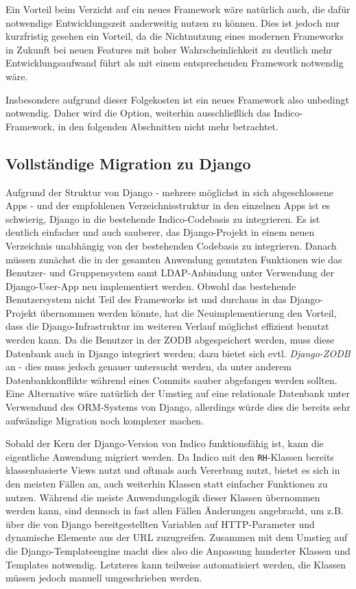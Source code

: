 Ein Vorteil beim Verzicht auf ein neues Framework wäre natürlich auch, die dafür notwendige
Entwicklungszeit anderweitig nutzen zu können. Dies ist jedoch nur kurzfristig gesehen ein Vorteil,
da die Nichtnutzung eines modernen Frameworks in Zukunft bei neuen Features mit hoher
Wahrscheinlichkeit zu deutlich mehr Entwicklungsaufwand führt als mit einem entsprechenden Framework
notwendig wäre.

Insbesondere aufgrund dieser Folgekosten ist ein neues Framework also unbedingt notwendig. Daher
wird die Option, weiterhin ausschließlich das Indico-Framework, in den folgenden Abschnitten nicht
mehr betrachtet.


\subsection{Vollständige Migration zu Django}
Aufgrund der Struktur von Django - mehrere möglichst in sich abgeschlossene Apps - und der
empfohlenen Verzeichnisstruktur in den einzelnen Apps ist es schwierig, Django in die bestehende
Indico-Codebasis zu integrieren. Es ist deutlich einfacher und auch sauberer, das Django-Projekt in
einem neuen Verzeichnis unabhängig von der bestehenden Codebasis zu integrieren. Danach müssen
zunächst die in der gesamten Anwendung genutzten Funktionen wie das Benutzer- und
Gruppensystem samt LDAP-Anbindung unter Verwendung der Django-User-App neu implementiert werden.
Obwohl das bestehende Benutzersystem nicht Teil des Frameworks ist und durchaus in
das Django-Projekt übernommen werden könnte, hat die Neuimplementierung den Vorteil, dass die
Django-Infrastruktur im weiteren Verlauf möglichst effizient benutzt werden kann. Da die Benutzer in
der ZODB abgespeichert werden, muss diese Datenbank auch in Django integriert werden; dazu bietet
sich evtl. \emph{Django-ZODB} an - dies muss jedoch genauer untersucht werden, da unter
anderem Datenbankkonflikte während eines Commits sauber abgefangen werden sollten. Eine Alternative
wäre natürlich der Umstieg auf eine relationale Datenbank unter Verwendund des ORM-Systems von
Django, allerdings würde dies die bereits sehr aufwändige Migration noch komplexer machen.

Sobald der Kern der Django-Version von Indico funktionsfähig ist, kann die eigentliche Anwendung
migriert werden. Da Indico mit den \lstinline{RH}-Klassen bereits klassenbasierte Views nutzt und
oftmals auch Vererbung nutzt, bietet es sich in den meisten Fällen an, auch weiterhin Klassen statt
einfacher Funktionen zu nutzen. Während die meiste Anwendungslogik dieser Klassen übernommen werden
kann, sind dennoch in fast allen Fällen Änderungen angebracht, um z.B. über die von Django
bereitgestellten Variablen auf HTTP-Parameter und dynamische Elemente aus der URL zuzugreifen.
Zusammen mit dem Umstieg auf die Django-Templateengine macht dies also die Anpassung hunderter
Klassen und Templates notwendig. Letzteres kann teilweise automatisiert werden, die Klassen müssen
jedoch manuell umgeschrieben werden.

